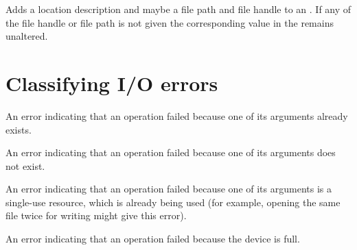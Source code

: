 \begin{haddockdesc}
\item[\begin{tabular}{@{}l}
annotateIOError :: IOError -> String -> Maybe Handle -> Maybe FilePath -> IOError
\end{tabular}]
{\haddockbegindoc
Adds a location description and maybe a file path and file handle
 to an .  If any of the file handle or file path is not given
 the corresponding value in the  remains unaltered.\par}
\end{haddockdesc}
\section{Classifying I/O errors}
\begin{haddockdesc}
\item[\begin{tabular}{@{}l}
isAlreadyExistsError :: IOError -> Bool
\end{tabular}]
{\haddockbegindoc
An error indicating that an  operation failed because
 one of its arguments already exists.\par}
\end{haddockdesc}
\begin{haddockdesc}
\item[\begin{tabular}{@{}l}
isDoesNotExistError :: IOError -> Bool
\end{tabular}]
{\haddockbegindoc
An error indicating that an  operation failed because
 one of its arguments does not exist.\par}
\end{haddockdesc}
\begin{haddockdesc}
\item[\begin{tabular}{@{}l}
isAlreadyInUseError :: IOError -> Bool
\end{tabular}]
{\haddockbegindoc
An error indicating that an  operation failed because
 one of its arguments is a single-use resource, which is already
 being used (for example, opening the same file twice for writing
 might give this error).\par}
\end{haddockdesc}
\begin{haddockdesc}
\item[\begin{tabular}{@{}l}
isFullError :: IOError -> Bool
\end{tabular}]
{\haddockbegindoc
An error indicating that an  operation failed because
 the device is full.\par}
\end{haddockdesc}
